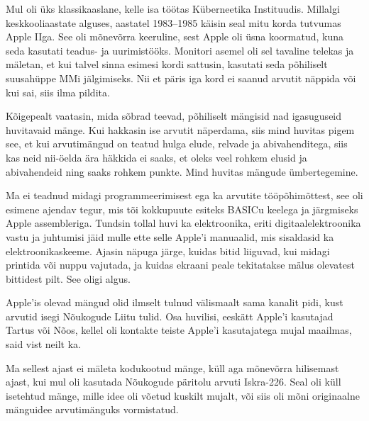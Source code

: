 

Mul oli üks klassikaaslane, kelle isa töötas Küberneetika 
Instituudis. Millalgi
keskkooliaastate alguses, aastatel 1983–1985 
käisin seal mitu korda tutvumas Apple 
IIga. See oli mõnevõrra keeruline, sest Apple oli 
üsna koormatud, kuna seda kasutati
teadus- ja uurimistööks. 
Monitori asemel oli sel tavaline telekas ja mäletan, et kui talvel sinna esimesi kordi sattusin, kasutati seda põhiliselt 
suusahüppe MMi jälgimiseks. Nii et päris iga kord ei saanud 
arvutit näppida või kui sai, siis ilma pildita. 


Kõigepealt vaatasin, mida sõbrad teevad, põhiliselt mängisid nad igasuguseid 
huvitavaid mänge. Kui hakkasin ise arvutit
näperdama, siis mind huvitas pigem see, et kui arvutimängud on 
teatud hulga elude, relvade ja 
abivahenditega, siis kas neid nii-öelda ära häkkida ei 
saaks, et oleks veel rohkem elusid ja abivahendeid ning 
saaks rohkem punkte. Mind huvitas mängude ümbertegemine. 

Ma ei teadnud midagi programmeerimisest ega ka arvutite 
tööpõhimõttest, see oli esimene ajendav tegur, mis tõi kokkupuute esiteks 
BASICu keelega ja järgmiseks Apple 
assembleriga. Tundsin tollal huvi ka 
elektroonika, eriti digitaalelektroonika vastu ja juhtumisi jäid mulle 
ette selle Apple'i manuaalid, mis sisaldasid ka 
elektroonikaskeeme. Ajasin näpuga järge, kuidas bitid liiguvad, kui midagi 
printida või nuppu vajutada, ja kuidas ekraani peale tekitatakse 
mälus olevatest bittidest pilt. See oligi algus.


Apple'is olevad mängud olid ilmselt tulnud välismaalt sama kanalit pidi, kust 
arvutid isegi Nõukogude Liitu tulid. Osa huvilisi, eeskätt 
Apple'i kasutajad Tartus või Nõos, kellel oli kontakte teiste Apple'i kasutajatega mujal 
maailmas, said vist neilt ka.


Ma sellest ajast ei mäleta kodukootud mänge, 
küll aga mõnevõrra hilisemast ajast, kui mul oli kasutada Nõukogude 
päritolu arvuti 
Iskra-226. Seal oli küll 
isetehtud mänge, mille idee oli võetud kuskilt mujalt, 
või siis oli mõni originaalne mänguidee arvutimänguks vormistatud. 

